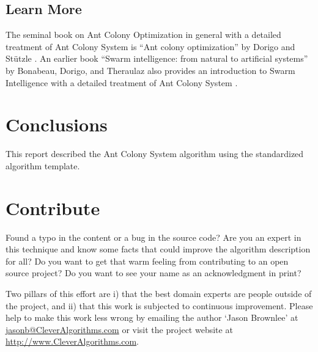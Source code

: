 \documentclass[a4paper, 11pt]{article}
\makeatletter
\newcommand{\myreportauthor}{Jason Brownlee}
\newcommand{\myreportemail}{jasonb@CleverAlgorithms.com}
\newcommand{\myreportwebsite}{http://www.CleverAlgorithms.com}
\makeatother
\begin{document}
% 
% 
\subsection{Learn More}
The seminal book on Ant Colony Optimization in general with a detailed treatment of Ant Colony System is ``Ant colony optimization'' by Dorigo and St\"utzle \cite{Dorigo2004}. An earlier book ``Swarm intelligence: from natural to artificial systems'' by Bonabeau, Dorigo, and Theraulaz also provides an introduction to Swarm Intelligence with a detailed treatment of Ant Colony System \cite{Bonabeau1999}.


% 
% 
\section{Conclusions}
\label{sec:conclusions}
This report described the Ant Colony System algorithm using the standardized algorithm template.

% 
% 
\section{Contribute}
\label{sec:contribute}
Found a typo in the content or a bug in the source code? 
Are you an expert in this technique and know some facts that could improve the algorithm description for all?
Do you want to get that warm feeling from contributing to an open source project? 
Do you want to see your name as an acknowledgment in print?

Two pillars of this effort are i) that the best domain experts are people outside of the project, and ii) that this work is subjected to continuous improvement. 
Please help to make this work less wrong by emailing the author `\myreportauthor' at \url{\myreportemail} or visit the project website at \url{\myreportwebsite}.



\end{document}
